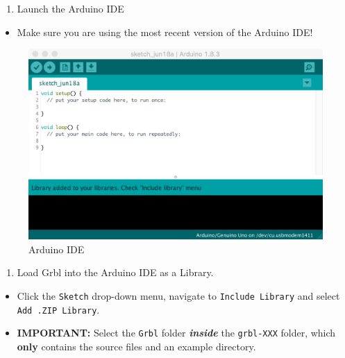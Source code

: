 \documentclass[]{book}
\providecommand{\tightlist}{%
  \setlength{\itemsep}{0pt}\setlength{\parskip}{0pt}}
\theoremstyle{definition}
\theoremstyle{definition}
\theoremstyle{remark}
\begin{document}
\begin{enumerate}
\def\labelenumi{\arabic{enumi}.}
\setcounter{enumi}{1}
\tightlist
\item
  Launch the Arduino IDE
\end{enumerate}

\begin{itemize}
\tightlist
\item
  Make sure you are using the most recent version of the Arduino IDE!
\end{itemize}

\begin{figure}

{\centering \includegraphics[width=0.75\linewidth]{images/arduino_IDE} 

}

\caption{Arduino IDE}\label{fig:arduinoIDE}
\end{figure}

\begin{enumerate}
\def\labelenumi{\arabic{enumi}.}
\setcounter{enumi}{2}
\tightlist
\item
  Load Grbl into the Arduino IDE as a Library.
\end{enumerate}

\begin{itemize}
\tightlist
\item
  Click the \texttt{Sketch} drop-down menu, navigate to
  \texttt{Include\ Library} and select \texttt{Add\ .ZIP\ Library}.
\item
  \textbf{IMPORTANT:} Select the \texttt{Grbl} folder
  \textbf{\emph{inside}} the \texttt{grbl-XXX} folder, which
  \textbf{only} contains the source files and an example directory.
\end{itemize}
\end{document}
